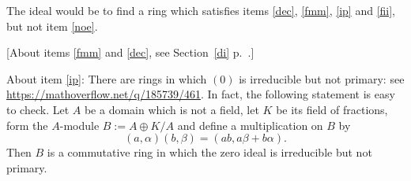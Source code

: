 \documentclass[12pt]{article}
\begin{document}
The ideal would be to find a ring which satisfies items \ref{dec}, \ref{fmm}, \ref{ip} and \ref{fii}, but not item \ref{noe}.%

[About items \ref{fmm} and \ref{dec}, see Section~\ref{di} p.~\pageref{di}.]

About item \ref{ip}: There are rings in which $(0)$ is irreducible but not primary: see \href{https://mathoverflow.net/q/185739/461}{https://mathoverflow.net/q/185739/461}. In fact, the following statement is easy to check. Let $A$ be a domain which is not a field, let $K$ be its field of fractions, form the $A$-module $B:=A\oplus K/A$ and define a multiplication on $B$ by $$(a,\alpha)(b,\beta)=(ab,a\beta+b\alpha).$$ Then $B$ is a commutative ring in which the zero ideal is irreducible but not primary. 
\end{document}
